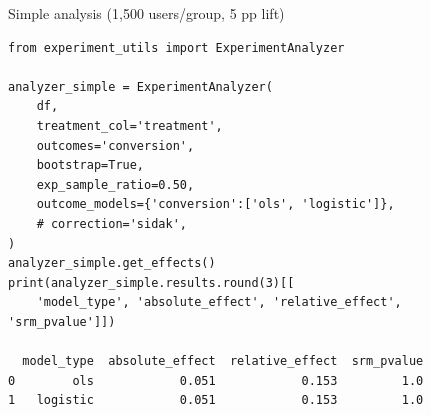 \documentclass{beamer}
\begin{document}
\begin{frame}[fragile]{Simple analysis  (1,500 users/group, 5 pp lift)}

\begin{verbatim}
from experiment_utils import ExperimentAnalyzer

analyzer_simple = ExperimentAnalyzer(
    df,
    treatment_col='treatment',
    outcomes='conversion',
    bootstrap=True,
    exp_sample_ratio=0.50,
    outcome_models={'conversion':['ols', 'logistic']},
    # correction='sidak',
)
analyzer_simple.get_effects()
print(analyzer_simple.results.round(3)[[
    'model_type', 'absolute_effect', 'relative_effect', 'srm_pvalue']])

  model_type  absolute_effect  relative_effect  srm_pvalue
0        ols            0.051            0.153         1.0
1   logistic            0.051            0.153         1.0
\end{verbatim}
\end{frame}
\end{document}
